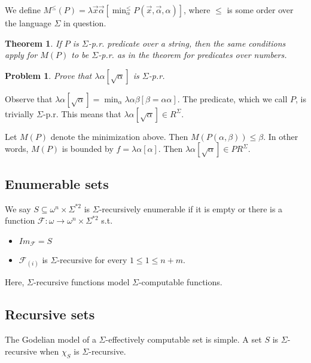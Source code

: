 \documentclass[a4paper, 12pt]{article}
\newtheorem{problem}{Problem}
\newtheorem{theorem}{Theorem}
\newtheorem{problem}{Problem}
\newtheorem{theorem}{Theorem}
\begin{document}
We define $M^{\leq}(P) = \lambda \overrightarrow{x} \overrightarrow{\alpha}
\left[ \min_{\alpha}^{\leq} P(\overrightarrow{x}, \overrightarrow{\alpha},
\alpha) \right] $, where $\leq$ is some order over the language $\Sigma$ in
question.

\begin{theorem}
    If $P$ is $\Sigma$-p.r. predicate over a string, then the same conditions
    apply for $M(P)$ to be $\Sigma$-p.r. as in the theorem for predicates over
    numbers.
\end{theorem}

\begin{problem}
    Prove that $\lambda \alpha[\sqrt{\alpha} ]$ is $\Sigma$-p.r.
\end{problem}

Observe that $\lambda \alpha \left[ \sqrt{\alpha}  \right] = \min_{\alpha}
\lambda \alpha \beta [\beta = \alpha \alpha]$. The predicate, which we call $P$,
is trivially $\Sigma$-p.r. This means that $\lambda \alpha[\sqrt{ \alpha } ] \in
R^{\Sigma}$. 

Let $M(P)$ denote the minimization above. Then $M\left(P\left(\alpha,
\beta\right)\right) \leq \beta$. In other words, $M(P)$ is bounded by $f =
\lambda \alpha [\alpha]$. Then $\lambda \alpha [\sqrt{\alpha} ] \in
PR^{\Sigma}$.


\subsection{Enumerable sets}

We say $S \subseteq \omega^n \times \Sigma^{*2}$ is $\Sigma$-recursively
enumerable if it is empty or there is a function $\mathcal{F} : \omega \to
\omega^n \times \Sigma^{*2}$ s.t.

\begin{itemize}
    \item $Im_{\mathcal{F}} = S$ 
    \item $\mathcal{F}_{(i)}$ is $\Sigma$-recursive for every $1 \leq 1 \leq n + m$.
\end{itemize}

Here, $\Sigma$-recursive functions model $\Sigma$-computable functions.

\subsection{Recursive sets}

The Godelian model of a $\Sigma$-effectively computable set is simple. A set $S$
is $\Sigma$-recursive when $\chi_{S}$ is $\Sigma$-recursive.
\end{document}
